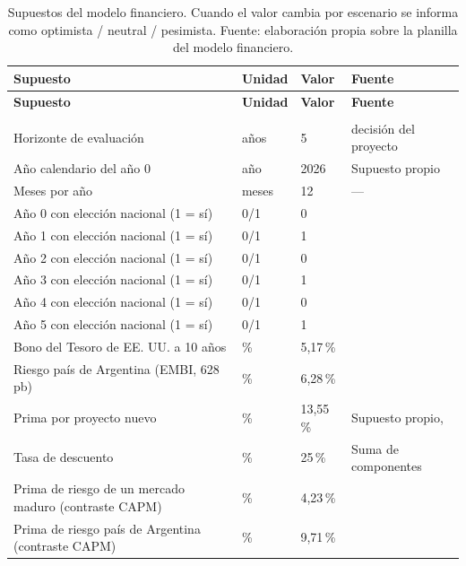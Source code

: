 {\footnotesize
\begin{longtable}{@{}>{\raggedright\arraybackslash}p{5.2cm} p{2.1cm} p{2.4cm} >{\raggedright\arraybackslash}p{4.1cm}@{}}
  \caption{Supuestos del modelo financiero. Cuando el valor cambia por escenario se informa como optimista / neutral / pesimista. Fuente: elaboración propia sobre la planilla del modelo financiero.}
  \label{tab:financiero-supuestos} \\
  \hline
  \textbf{Supuesto} & \textbf{Unidad} & \textbf{Valor} & \textbf{Fuente} \\
  \hline
  \endfirsthead
  \hline
  \textbf{Supuesto} & \textbf{Unidad} & \textbf{Valor} & \textbf{Fuente} \\
  \hline
  \endhead
  \hline
  \endfoot
    \multicolumn{4}{@{}l}{\textit{Horizonte, calendario y tasa}} \\
    Horizonte de evaluación & años & 5 & decisión del proyecto \\
    Año calendario del año 0 & año & 2026 & Supuesto propio \\
    Meses por año & meses & 12 & — \\
    Año 0 con elección nacional (1 = sí) & 0/1 & 0 & \parencite{ConvencionConstituyente1994} \\
    Año 1 con elección nacional (1 = sí) & 0/1 & 1 &  \\
    Año 2 con elección nacional (1 = sí) & 0/1 & 0 &  \\
    Año 3 con elección nacional (1 = sí) & 0/1 & 1 &  \\
    Año 4 con elección nacional (1 = sí) & 0/1 & 0 &  \\
    Año 5 con elección nacional (1 = sí) & 0/1 & 1 &  \\
    Bono del Tesoro de EE. UU. a 10 años & \% & 5,17\,\% & \parencite{FederalReserve2026} \\
    Riesgo país de Argentina (EMBI, 628 pb) & \% & 6,28\,\% & \parencite{RavaBursatil2026} \\
    Prima por proyecto nuevo & \% & 13,55\,\% & Supuesto propio, \parencite{Damodaran2010} \\
    Tasa de descuento & \% & 25\,\% & Suma de componentes \\
    Prima de riesgo de un mercado maduro (contraste CAPM) & \% & 4,23\,\% & \parencite{Damodaran2026} \\
    Prima de riesgo país de Argentina (contraste CAPM) & \% & 9,71\,\% & \parencite{Damodaran2026} \\

\end{longtable}}
